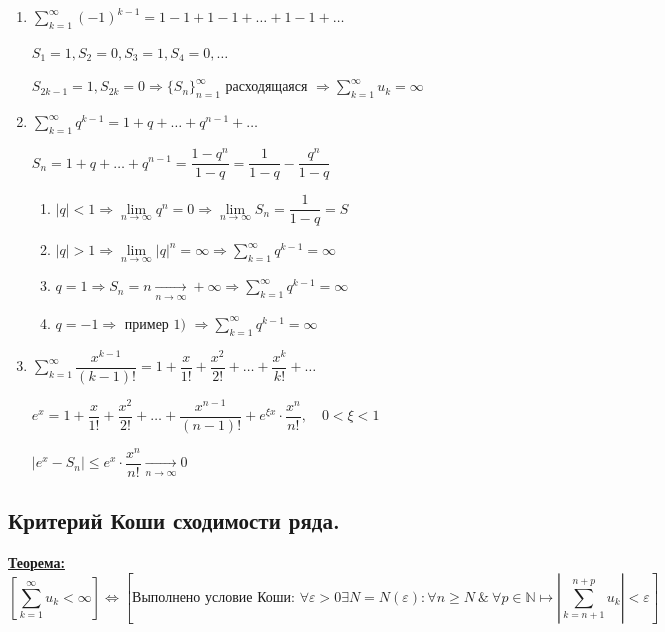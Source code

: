 \documentclass[a4paper,12pt]{article} %
\newcommand{\N}{\mathbb{N}}
\newcommand{\useriesl}{\sum\limits_{k=1}^{\infty} u_k < \infty}
\newcommand{\useriese}{\sum\limits_{k=1}^{\infty} u_k = \infty}
\begin{document}
\begin{enumerate}
	\item $\sum\limits_{k=1}^{\infty} (-1)^{k-1} = 1 - 1 + 1 - 1 + \ldots + 1 - 1 + \ldots$
	
	$S_1 = 1, S_2 = 0, S_3 = 1, S_4 = 0, \ldots$
	
	$S_{2k-1} = 1, S_{2k} = 0 \Rightarrow \{{S_n}\}_{n=1}^{\infty} \text{ расходящаяся } \Rightarrow \useriese$
	\item $\sum\limits_{k=1}^{\infty} q^{k-1} = 1 + q + \ldots + q^{n-1} + \ldots$
	
	$S_n = 1 + q + \ldots + q^{n-1} = \dfrac{1 - q^n}{1 - q} = \dfrac{1}{1 - q} - \dfrac{q^n}{1 - q}$
	
	\begin{enumerate}[label=\asbuk*),ref=\asbuk*]
		\item $|q|<1 \Rightarrow \lim\limits_{n \to \infty} q^n = 0 \Rightarrow \lim\limits_{n \to \infty} S_n = \dfrac{1}{1 - q} = S$
		\item $|q|>1 \Rightarrow \lim\limits_{n \to \infty} |q|^n = \infty \Rightarrow \sum\limits_{k=1}^{\infty} q^{k-1} = \infty$
		\item $q=1 \Rightarrow S_n = n \xrightarrow[n \to \infty]{} +\infty \Rightarrow \sum\limits_{k=1}^{\infty} q^{k-1} = \infty$
		\item $q=-1 \Rightarrow \text{ пример 1) } \Rightarrow \sum\limits_{k=1}^{\infty} q^{k-1} = \infty$
	\end{enumerate}

	\item $\sum\limits_{k=1}^{\infty} \dfrac{x^{k-1}}{(k-1)!} = 1 + \dfrac{x}{1!} + \dfrac{x^2}{2!} + \ldots + \dfrac{x^k}{k!} + \ldots$
	
	$e^x = 1 + \dfrac{x}{1!} + \dfrac{x^2}{2!} + \ldots + \dfrac{x^{n-1}}{(n-1)!} + e^{\xi x} \cdot \dfrac{x^n}{n!}, \hspace{1em} 0<\xi<1$
	
	$|e^x - S_n| \leqslant e^x \cdot \dfrac{x^n}{n!} \xrightarrow[n \to \infty]{} 0$
\end{enumerate}

\subsection{Критерий Коши сходимости ряда.}

\underline{\textbf{Теорема:}}
\[ \left[\useriesl \right] \Leftrightarrow \left[\text{Выполнено условие Коши: } \forall \varepsilon > 0  \exists N = N(\varepsilon): \forall n \geqslant N \ \& \ \forall p \in \N \mapsto \left|\sum\limits_{k=n+1}^{n+p} u_k \right| < \varepsilon \right] \]
\end{document}
